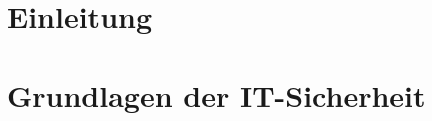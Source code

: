 \documentclass [a4paper,11pt,oneside,german,webreferences,todo]{INSOthesis}
\begin{document}
\maketitle

%

\chapter{Einleitung}
\label{ch:ch1}


\chapter{Grundlagen der IT-Sicherheit}
\label{ch:ch2}


%

%

\appendix

\printbibliography
\BackMatter
\end{document}

